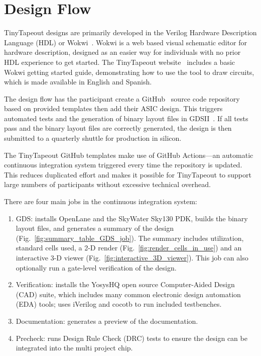 \section{Design Flow}
\label{sec:design_flow}

TinyTapeout designs are primarily developed in the Verilog Hardware Description Language (HDL) or Wokwi~\cite{wokwi}.
Wokwi is a web based visual schematic editor for hardware description, designed as an easier way for individuals with no prior HDL experience to get started.
The TinyTapeout website~\cite{tinytapeout} includes a basic Wokwi getting started guide, demonstrating how to use the tool to draw circuits, which is made available in English and Spanish.

The design flow has the participant create a GitHub~\cite{github} source code repository based on provided templates then add their ASIC design. This triggers automated tests and the generation of binary layout files in GDSII~\cite{gds}. If all tests pass and the binary layout files are correctly generated, the design is then submitted to a quarterly shuttle for production in silicon.

The TinyTapeout GitHub templates\cite{verilogtemplate} make use of GitHub Actions\cite{githubactions}---an automatic continuous integration system triggered every time the repository is updated. This reduces duplicated effort and makes it possible for TinyTapeout to support large numbers of participants without excessive technical overhead.

There are four main jobs in the continuous integration system:

\begin{enumerate}
	\item GDS: installs OpenLane\cite{openlane} and the SkyWater Sky130\cite{skywaterpdk} PDK, builds the binary layout files, and generates a summary of the design (Fig.~\ref{fig:summary_table_GDS_job}). The summary includes utilization, standard cells used, a 2-D render (Fig.~\ref{fig:render_cells_in_use}) and an interactive 3-D viewer (Fig.~\ref{fig:interactive_3D_viewer}).
This job can also optionally run a gate-level verification of the design.
	\item Verification: installs the YosysHQ open source Computer-Aided Design (CAD) suite, which includes many common electronic design automation (EDA) tools; uses iVerilog\cite{iverilog} and cocotb\cite{cocotb} to run included testbenches.
	\item Documentation: generates a preview of the documentation.
	\item Precheck: runs Design Rule Check (DRC) tests to ensure the design can be integrated into the multi project chip.
\end{enumerate}

